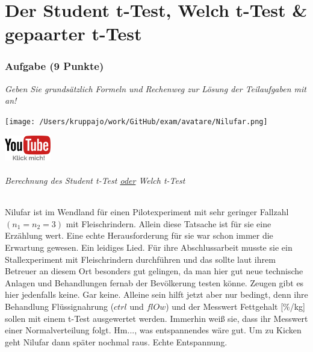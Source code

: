 \documentclass[a4paper, 9pt]{scrartcl}\usepackage[]{graphicx}\usepackage[]{xcolor}
\begin{document}
\part{Der Student t-Test, Welch t-Test \& gepaarter t-Test}

\section{Aufgabe \hfill (9 Punkte)}

\textit{Geben Sie grundsätzlich Formeln und Rechenweg zur Lösung der Teilaufgaben mit an!} \\[1Ex]
 

 
\begin{minipage}[t]{0.5\textwidth}
\texttt{[image: /Users/kruppajo/work/GitHub/exam/avatare/Nilufar.png]}
\end{minipage}
\begin{minipage}[t]{0.5\textwidth}
\hfill
\href{https://youtu.be/eejS2uG4o-M}{\includegraphics[width = 2cm]{img/youtube}}
\end{minipage}
\vspace{-3ex}



\paragraph{Berechnung des Student t-Test \underline{oder} Welch t-Test}

Nilufar ist im Wendland für einen Pilotexperiment mit sehr geringer Fallzahl $(n_1 = n_2 = 3)$ mit Fleischrindern. Allein diese Tatsache ist für sie eine Erzählung wert. Eine echte Herausforderung für sie war schon immer die Erwartung gewesen. Ein leidiges Lied.  Für ihre Abschlussarbeit musste sie ein Stallexperiment mit Fleischrindern durchführen und das sollte laut ihrem Betreuer an diesem Ort besonders gut gelingen, da man hier gut neue technische Anlagen und Behandlungen fernab der Bevölkerung testen könne. Zeugen gibt es hier jedenfalls keine. Gar keine.  Alleine sein hilft jetzt aber nur bedingt, denn ihre Behandlung Flüssignahrung ($ctrl$ und $flOw$) und der Messwert Fettgehalt [\%/kg] sollen mit einem t-Test ausgewertet werden. Immerhin weiß sie, dass ihr Messwert einer Normalverteilung folgt. Hm..., was entspannendes wäre gut. Um zu Kicken geht Nilufar dann später nochmal raus. Echte Entspannung.
\end{document}
